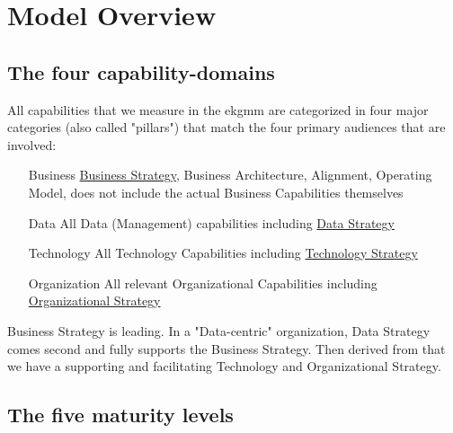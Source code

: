 \chapter{Model Overview}\label{ch:model-overview}

\section{The four capability-domains}\label{sec:the-four-capability-domains}

All capabilities that we measure in the \gls{ekgmm} are categorized in 
four major categories (also called "pillars") that match the 
four primary audiences that are involved:

\begin{enumerate}[leftmargin=1in,font=\bfseries]
    \item [Business]     \ul{Business Strategy}, Business Architecture, Alignment, Operating Model, does not include the actual Business Capabilities themselves
    \item [Data]         All Data (Management) capabilities including \ul{Data Strategy}
    \item [Technology]   All Technology Capabilities including \ul{Technology Strategy}
    \item [Organization] All relevant Organizational Capabilities including \ul{Organizational Strategy}
\end{enumerate}

Business Strategy is leading.
In a "Data-centric" organization, Data Strategy comes second and fully supports the Business Strategy.
Then derived from that we have a supporting and facilitating Technology and Organizational Strategy.

\section{The five maturity levels}\label{sec:the-five-maturity-levels}









